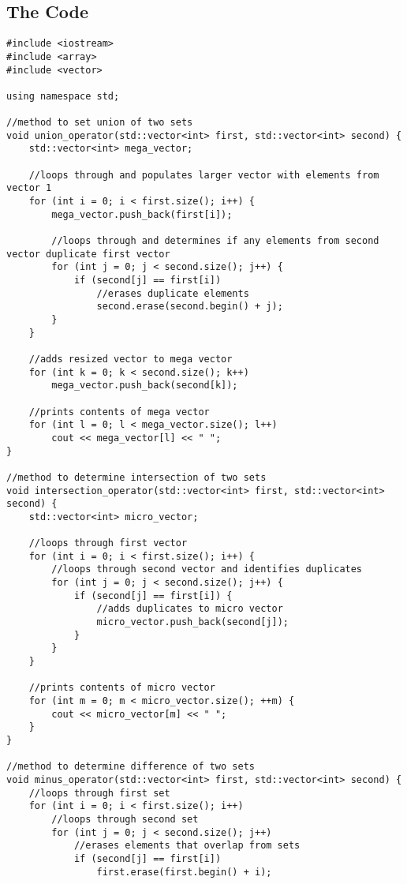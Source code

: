\documentclass[11pt]{article}
\begin{document}
\subsection*{The Code}
\begin{lstlisting}
#include <iostream>
#include <array>
#include <vector>

using namespace std;

//method to set union of two sets
void union_operator(std::vector<int> first, std::vector<int> second) {
    std::vector<int> mega_vector;

    //loops through and populates larger vector with elements from vector 1
    for (int i = 0; i < first.size(); i++) {
        mega_vector.push_back(first[i]);

        //loops through and determines if any elements from second vector duplicate first vector
        for (int j = 0; j < second.size(); j++) {
            if (second[j] == first[i])
                //erases duplicate elements
                second.erase(second.begin() + j);
        }
    }

    //adds resized vector to mega vector
    for (int k = 0; k < second.size(); k++)
        mega_vector.push_back(second[k]);

    //prints contents of mega vector
    for (int l = 0; l < mega_vector.size(); l++)
        cout << mega_vector[l] << " ";
}

//method to determine intersection of two sets
void intersection_operator(std::vector<int> first, std::vector<int> second) {
    std::vector<int> micro_vector;

    //loops through first vector
    for (int i = 0; i < first.size(); i++) {
        //loops through second vector and identifies duplicates
        for (int j = 0; j < second.size(); j++) {
            if (second[j] == first[i]) {
                //adds duplicates to micro vector
                micro_vector.push_back(second[j]);
            }
        }
    }

    //prints contents of micro vector
    for (int m = 0; m < micro_vector.size(); ++m) {
        cout << micro_vector[m] << " ";
    }
}

//method to determine difference of two sets
void minus_operator(std::vector<int> first, std::vector<int> second) {
    //loops through first set
    for (int i = 0; i < first.size(); i++)
        //loops through second set
        for (int j = 0; j < second.size(); j++)
            //erases elements that overlap from sets
            if (second[j] == first[i])
                first.erase(first.begin() + i);


\end{lstlisting}
\end{document}
